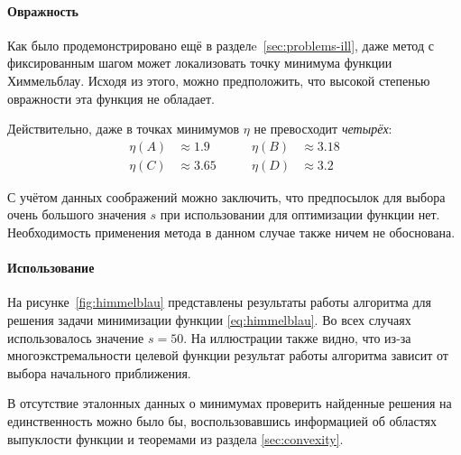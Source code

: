 \paragraph{Овражность}
Как было продемонстрировано ещё в разделe \ref{sec:problems-ill}, даже
метод \gd{} с фиксированным шагом может локализовать точку минимума
функции Химмельблау. Исходя из этого, можно предположить, что высокой
степенью овражности эта функция не обладает.

Действительно, даже в точках минимумов $\eta$ не превосходит
\emph{четырёх}:
\begin{equation}
  \begin{aligned}
    \eta(A) & \approx 1.9&\qquad
    \eta(B) & \approx 3.18\\
    \eta(C) & \approx 3.65&\qquad
    \eta(D) & \approx 3.2
\end{aligned}
\end{equation}

С учётом данных соображений можно заключить, что предпосылок для
выбора очень большого значения $s$ при использовании \relch{} для
оптимизации функции нет. Необходимость применения метода \gdrelch{} в
данном случае также ничем не обоснована.

\paragraph{Использование \relch{}}

На рисунке \ref{fig:himmelblau} представлены результаты работы
алгоритма \relch{} для решения задачи минимизации функции
\eqref{eq:himmelblau}. Во всех случаях использовалось значение $s=50$.
На иллюстрации также видно, что из-за многоэкстремальности целевой
функции результат работы алгоритма зависит от выбора начального
приближения.

В отсутствие эталонных данных о минимумах проверить найденные решения
на единственность можно было бы, воспользовавшись информацией об
областях выпуклости функции и теоремами из раздела
\ref{sec:convexity}.

